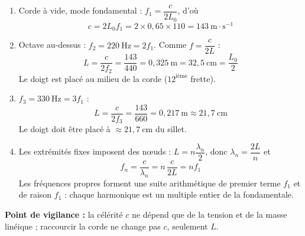 \documentclass[11pt]{article}
\begin{document}
\begin{corrige}
\begin{enumerate}
    \item Corde à vide, mode fondamental : $f_1 = \dfrac{c}{2L_0}$, d'où
    \[
    c = 2L_0 f_1 = 2 \times 0{,}65 \times 110 = 143\ \text{m}\cdot\text{s}^{-1}
    \]
    \item Octave au-dessus : $f_2 = 220\ \text{Hz} = 2f_1$. Comme $f = \dfrac{c}{2L}$ :
    \[
    L = \frac{c}{2f_2} = \frac{143}{440} = 0{,}325\ \text{m} = 32{,}5\ \text{cm} = \frac{L_0}{2}
    \]
    Le doigt est placé au milieu de la corde ($12^{\text{ième}}$ frette).
    \item $f_3 = 330\ \text{Hz} = 3f_1$ :
    \[
    L = \frac{c}{2f_3} = \frac{143}{660} = 0{,}217\ \text{m} \approx 21{,}7\ \text{cm}
    \]
    Le doigt doit être placé à $\approx 21{,}7\ \text{cm}$ du sillet.
    \item Les extrémités fixes imposent des nœuds : $L = n\dfrac{\lambda_n}{2}$, donc $\lambda_n = \dfrac{2L}{n}$ et
    \[
    f_n = \frac{c}{\lambda_n} = n\,\frac{c}{2L} = n f_1
    \]
    Les fréquences propres forment une suite arithmétique de premier terme $f_1$ et de raison $f_1$ : chaque harmonique est un multiple entier de la fondamentale.
\end{enumerate}
\textbf{Point de vigilance :} la célérité $c$ ne dépend que de la tension et de la masse linéique ; raccourcir la corde ne change pas $c$, seulement $L$.
\end{corrige}
\end{document}
